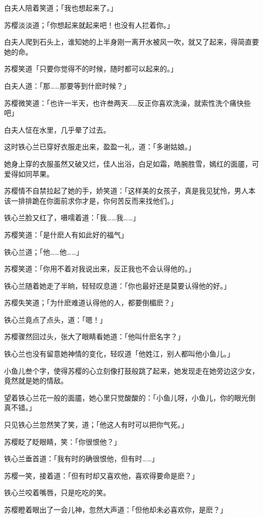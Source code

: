 \documentclass[12pt,oneside]{book}
\begin{document}
白夫人陪着笑道；「我也想起来了。」

苏樱淡淡道；「你想起来就起来吧！也没有人拦着你。」

白夫人爬到石头上，谁知她的上半身刚一离开水被风一吹，就又了起来，得简直要她的命。

苏樱笑道「只要你觉得不的时候，随时都可以起来的。」

白夫人道：「那\ldots\ldots 那要等到什麽时候？」

苏樱微笑道：「也许一半天，也许叁两天\ldots\ldots 反正你喜欢洗澡，就索性洗个痛快些吧」

白夫人怔在水里，几乎晕了过去。

这时铁心兰已穿好衣服走出来，盈盈一礼，道：「多谢姑娘。」

她身上穿的衣服虽然又破又烂，佳人出浴，白足如霜，皓腕胜雪，嫣红的面靥，可爱得如同苹果。

苏樱情不自禁拉起了她的手，娇笑道：「这样美的女孩子，真是我见犹怜，男人本该一排排跪在你面前求你才是，你何苦反而来找他们。」

铁心兰脸又红了，嗫嚅着道：「我\ldots\ldots 我\ldots\ldots」

苏樱笑道：「是什麽人有如此好的福气」

铁心兰道；「他\ldots\ldots 他\ldots\ldots」

苏樱笑道：「你用不着对我说出来，反正我也不会认得他的。」

铁心兰随着她走了半晌，轻轻叹息道：「你也最好还是莫要认得他的好。」

苏樱失笑道；「为什麽难道认得他的人，都要倒楣麽？」

铁心兰竟点了点头，道：「嗯！」

苏樱骤然回过头，张大了眼睛看她道：「他叫什麽名字？」

铁心兰也没有留意她神情的变化，轻叹道「他姓江，别人都叫他小鱼儿。」

小鱼儿叁个字，使得苏樱的心立刻像打鼓般跳了起来，她发现走在她旁边这少女，竟然就是她的情敌。

望着铁心兰花一般的面靥，她心里只觉酸酸的：「小鱼儿呀，小鱼儿，你的眼光倒真不错。」

只见铁心兰忽然笑了笑，道；「他这人有时可以把你气死。」

苏樱眨了眨眼睛，笑：「你很恨他？」

铁心兰垂首道：「我有时的确很恨他，但有时\ldots\ldots」

苏樱一笑，接着道：「但有时却又喜欢他，喜欢得要命是麽？」

铁心兰咬着嘴唇，只是吃吃的笑。

苏樱瞪着眼出了一会儿神，忽然大声道：「但他却未必喜欢你，是麽？」
\end{document}

